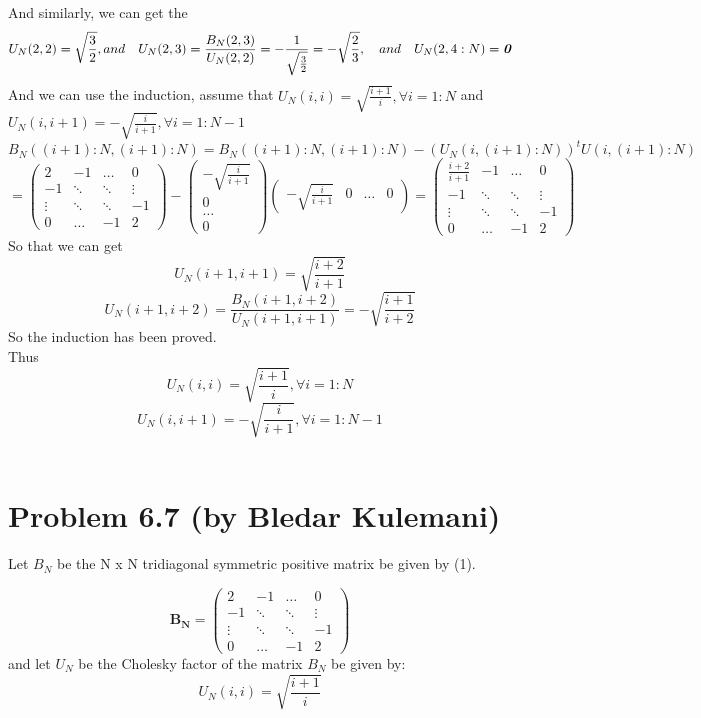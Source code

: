 \documentclass{article}
\DeclareMathOperator{\1}{\mathit{1}}
\numberwithin{figure}{section} %
\numberwithin{table}{section}
\begin{document}
And similarly, we can get the
\[
U_{N}(2,2) = \sqrt{\frac{3}{2}}, and \quad U_{N}(2,3) = \frac{B_{N}(2,3)}{U_{N}(2,2)} = -\frac{1}{\sqrt{\frac{3}{2}}} = -\sqrt{\frac{2}{3}},\quad and \quad U_{N}(2,4:N) =\emph{\textbf{0}} \]
And we can use the induction, assume that $U_{N}(i,i) = \sqrt{\frac{i+1}{i}}, \forall i=1:N$ and $U_{N}(i,i+1) = -\sqrt{\frac{i}{i+1}}, \forall i=1:N-1$ 
\[
B_{N}((i+1):N,(i+1):N) = B_{N}((i+1):N,(i+1):N)-(U_{N}(i,(i+1):N))^{t}U(i,(i+1):N) \]
\[
=
\left(
\begin{matrix}
2 & -1 & \dots & 0 \\
-1 & \ddots & \ddots & \vdots\\
\vdots & \ddots & \ddots & -1\\
0 & \dots & -1 & 2
\end{matrix} \right) - 
\left(
\begin{matrix}
-\sqrt{\frac{i}{i+1}}\\
0\\
\dots\\
0
\end{matrix} \right)
\left(
\begin{matrix}
 -\sqrt{\frac{i}{i+1}}&0&\dots&0
\end{matrix}\right)=
\left(
\begin{matrix}
\frac{i+2}{i+1} & -1 & \dots & 0 \\
-1 & \ddots & \ddots & \vdots\\
\vdots & \ddots & \ddots & -1\\
0 & \dots & -1 & 2
\end{matrix} \right)\]
So that we can get 
\[
U_{N}(i+1,i+1) = \sqrt{\frac{i+2}{i+1}}\]
\[
U_{N}(i+1,i+2) = \frac{B_{N}(i+1,i+2)}{U_{N}(i+1,i+1)} = -\sqrt{\frac{i+1}{i+2}}\]
So the induction has been proved. \\
Thus
\[
U_{N}(i,i) = \sqrt{\frac{i+1}{i}}, \forall i=1:N\]
\[
U_{N}(i,i+1) = -\sqrt{\frac{i}{i+1}}, \forall i=1:N-1\]\\

\section{Problem 6.7 (by Bledar Kulemani)} 
Let \(B_N\) be the N x N  tridiagonal symmetric positive matrix be given by (1). 

\begin{equation}
	\mathbf{B_N} = \left(
	\begin{array}{cccc}
	2 & -1 & \ldots & 0\\
	-1 & \ddots & \ddots & \vdots \\
	\vdots & \ddots & \ddots & -1 \\
	0 & \ldots & -1 & 2
	\end{array} \right)
\end{equation}
and let \(U_N\) be the Cholesky factor  of the matrix \(B_N\) be given by:
\begin{equation}
	U_N(i,i) = \sqrt{\frac{i+1}{i}}
\end{equation}
\end{document}
